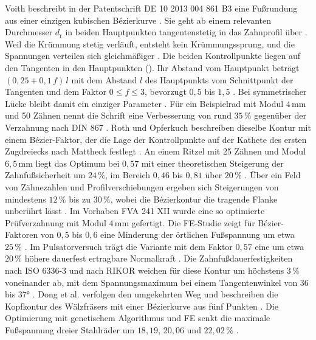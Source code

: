 Voith beschreibt in der Patentschrift DE 10 2013 004 861 B3 eine Fußrundung aus einer einzigen kubischen Bézierkurve \cite[S.~2]{DE102013004861B3}. Sie geht ab einem relevanten Durchmesser $d_{\mathrm{r}}$ in beiden Hauptpunkten tangentenstetig in das Zahnprofil über \cite[S.~3]{DE102013004861B3}. Weil die Krümmung stetig verläuft, entsteht kein Krümmungssprung, und die Spannungen verteilen sich gleichmäßiger \cite[S.~3]{DE102013004861B3}. Die beiden Kontrollpunkte liegen auf den Tangenten in den Hauptpunkten \cite[S.~4]{DE102013004861B3} (). Ihr Abstand vom Hauptpunkt beträgt $(0{,}25 + 0{,}1\,f)\,l$ mit dem Abstand $l$ des Hauptpunkts vom Schnittpunkt der Tangenten und dem Faktor $0 \leq f \leq 3$, bevorzugt $0{,}5$ bis $1{,}5$ \cite[S.~4]{DE102013004861B3}. Bei symmetrischer Lücke bleibt damit ein einziger Parameter \cite[S.~3]{DE102013004861B3}. Für ein Beispielrad mit Modul $4$\,mm und 50 Zähnen nennt die Schrift eine Verbesserung von rund $35\,\%$ gegenüber der Verzahnung nach DIN 867 \cite[S.~8 bis 9]{DE102013004861B3}. Roth und Opferkuch beschreiben dieselbe Kontur mit einem Bézier-Faktor, der die Lage der Kontrollpunkte auf der Kathete des ersten Zugdreiecks nach Mattheck festlegt \cite[S.~722]{RotOpf17}. An einem Ritzel mit 25 Zähnen und Modul $6{,}5$\,mm liegt das Optimum bei $0{,}57$ mit einer theoretischen Steigerung der Zahnfußsicherheit um $24\,\%$, im Bereich $0{,}46$ bis $0{,}81$ über $20\,\%$ \cite[S.~724 bis 725]{RotOpf17}. Über ein Feld von Zähnezahlen und Profilverschiebungen ergeben sich Steigerungen von mindestens $12\,\%$ bis zu $30\,\%$, wobei die Bézierkontur die tragende Flanke unberührt lässt \cite[S.~728 bis 729]{RotOpf17}. Im Vorhaben FVA 241 XII wurde eine so optimierte Prüfverzahnung mit Modul $4$\,mm gefertigt. Die FE-Studie zeigt für Bézier-Faktoren von $0{,}5$ bis $0{,}6$ eine Minderung der örtlichen Fußspannung um etwa $25\,\%$ \cite[S.~43]{FVA241-XII}. Im Pulsatorversuch trägt die Variante mit dem Faktor $0{,}57$ eine um etwa $20\,\%$ höhere dauerfest ertragbare Normalkraft \cite[S.~93]{FVA241-XII}. Die Zahnfußdauerfestigkeiten nach ISO 6336-3 und nach RIKOR weichen für diese Kontur um höchstens $3\,\%$ voneinander ab, mit dem Spannungsmaximum bei einem Tangentenwinkel von $36$ bis $37$° \cite[S.~94 bis 95]{FVA241-XII}. Dong et al. verfolgen den umgekehrten Weg und beschreiben die Kopfkontur des Wälzfräsers mit einer Bézierkurve aus fünf Punkten \cite[S.~4]{Don20}. Die Optimierung mit genetischem Algorithmus und FE senkt die maximale Fußspannung dreier Stahlräder um $18{,}19$, $20{,}06$ und $22{,}02\,\%$ \cite[S.~12 und 15]{Don20}.

